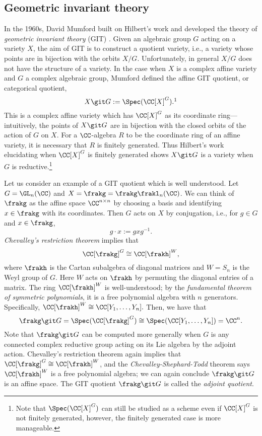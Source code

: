 \subsection{Geometric invariant theory}
In the 1960s, David Mumford built on Hilbert's work and developed the theory of \emph{geometric invariant theory} (GIT) \cite{Mumford65}.
Given an algebraic group $G$ acting on a variety $X$, the aim of GIT is to construct a quotient variety, i.e., a variety whose points are in bijection with the orbits $X/G$.
Unfortunately, in general $X/G$ does not have the structure of a variety.
In the case when $X$ is a complex affine variety and $G$ a complex algebraic group, Mumford defined the affine GIT quotient, or categorical quotient,
$$X \git G := \Spec(\CC[X]^G).\footnote{In this work, $\Spec$ denotes the maximal spectrum instead of the prime spectrum, i.e., we consider affine varieties instead of affine schemes. See \S \ref{varietiessection} for further discussion of our definition of a variety.}$$
This is a complex affine variety which has $\CC[X]^G$ as its coordinate ring---intuitively, the points of $X \git G$ are in bijection with the closed orbits of the action of $G$ on $X$.
For a $\CC$-algebra $R$ to be the coordinate ring of an affine variety, it is necessary that $R$ is finitely generated.
Thus Hilbert's work elucidating when $\CC[X]^G$ is finitely generated shows $X \git G$ is a variety when $G$ is reductive.\footnote{Note that $\Spec(\CC[X]^G)$ can still be studied as a scheme even if $\CC[X]^G$ is not finitely generated, however, the finitely generated case is more manageable.}

Let us consider an example of a GIT quotient which is well understood.
Let $G = \GL_n(\CC)$ and $X = \frakg = \frakg\frakl_n(\CC)$.
We can think of $\frakg$ as the affine space $\CC^{n\times n}$ by choosing a basis and identifying $x \in \frakg$ with its coordinates.
Then $G$ acts on $X$ by conjugation, i.e., for $g \in G$ and $x \in \frakg$,
$$g \cdot x := g x g^{-1}.$$
\emph{Chevalley's restriction theorem} \cite[\S 23]{Humphreys72} implies that 
$$\CC[\frakg]^G \cong \CC[\frakh]^W,$$
where $\frakh$ is the Cartan subalgebra of diagonal matrices and $W = S_n$ is the Weyl group of $G$.
Here $W$ acts on $\frakh$ by permuting the diagonal entries of a matrix.
The ring $\CC[\frakh]^W$ is well-understood;
by the \emph{fundamental theorem of symmetric polynomials}, it is a free polynomial algebra with $n$ generators.
Specifically, $\CC[\frakh]^W \cong \CC[Y_1, \ldots, Y_n].$
Then, we have that
$$\frakg \git G = \Spec(\CC[\frakg]^G) \cong \Spec(\CC[Y_1, \ldots, Y_n]) = \CC^n.$$
Note that $\frakg \git G$ can be computed more generally when $G$ is any connected complex reductive group acting on its Lie algebra by the adjoint action.
Chevalley's restriction theorem again implies that $\CC[\frakg]^G \cong \CC[\frakh]^W$, and the \emph{Chevalley-Shephard-Todd} theorem \cite[\S 3]{Humphreys90} says $\CC[\frakh]^W$ is a free polynomial algebra;
we can again conclude $\frakg\git G$ is an affine space.
The GIT quotient $\frakg \git G$ is called the \emph{adjoint quotient}.


